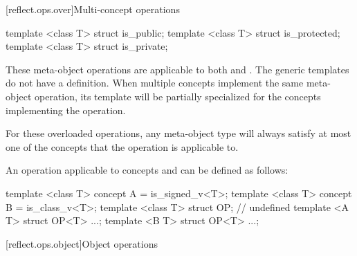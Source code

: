 [reflect.ops.over]{Multi-concept operations}

\begin{std.txt}\color{addclr}

\begin{itemdecl}
template <class T> struct is_public;
template <class T> struct is_protected;
template <class T> struct is_private;
\end{itemdecl}

\begin{itemdescr}
\pnum
These meta-object operations are applicable to both  and . The generic templates do not have a definition. When multiple concepts implement the same meta-object operation, its template will be partially specialized for the concepts implementing the operation.
\begin{note}
For these overloaded operations, any meta-object type will always satisfy at most one of the concepts that the operation is applicable to. 
\end{note}

\pnum
\begin{example}
An operation  applicable to concepts  and  can be defined as follows:
\begin{codeblock}
template <class T> concept A = is_signed_v<T>;
template <class T> concept B = is_class_v<T>;
template <class T> struct OP; // undefined
template <A T> struct OP<T> {...};
template <B T> struct OP<T> {...};
\end{codeblock}
\end{example}

\end{itemdescr}
\end{std.txt}

[reflect.ops.object]{Object operations}

